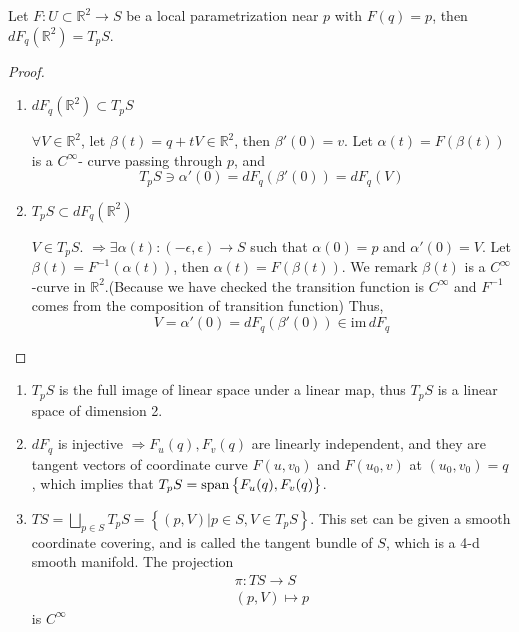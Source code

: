 \begin{proposition}
    Let \(F\colon U\subset \mathbb{R}^2\to S\) be a local parametrization near \(p\) with \(F(q)=p\), then \(dF_q\left(\mathbb{R}^2\right)=T_pS\).
\end{proposition}
\begin{proof}
    \hfill
    \begin{enumerate}[(1)]
        \item \(dF_q\left(\mathbb{R}^2\right)\subset T_p S\)

              \(\forall V\in \mathbb{R}^2\), let \(\beta(t)=q+t V\in \mathbb{R}
              ^2\), then \(\beta'(0)=v\). Let \(\alpha(t)=F\left(\beta(t)\right)
              \) is a \(C^\infty\)- curve passing through \(p\), and
              \[T_p S\ni \alpha'(0)=dF_q\left(\beta'(0)\right)=dF_q(V)\]
        \item \(T_p S\subset dF_q\left(\mathbb{R}^2\right)\)

              \(V\in T_p S\). \(\Rightarrow \exists \alpha(t)\colon (-\epsilon,
              \epsilon)\to S\) such that \(\alpha(0)=p\) and \(\alpha'(0)=V\).
              Let $\beta(t)=F^{-1}\left(\alpha(t)\right)$, then \(\alpha(t)=F
              \left(\beta(t)\right)\). We remark \(\beta(t)\) is a \(C^\infty\)
              -curve in \(\mathbb{R}^2\).(Because we have checked the transition
              function is \(C^\infty\) and \(F^{-1}\) comes from the composition
              of transition function) Thus,
              \[V=\alpha'(0)=dF_q\left(\beta'(0)\right)\in \mathrm{im}\,dF_q\]
    \end{enumerate}
\end{proof}
\begin{remark}
    \hfill
    \begin{enumerate}[(1)]
        \item \(T_p S\) is the full image of linear space under a linear map, thus \(T_pS\) is a linear space of dimension 2.
        \item \(dF_q\) is injective \(\Rightarrow\)\(F_u(q),F_v(q)\) are
              linearly independent, and they are tangent vectors of coordinate
              curve \(F(u,v_0)\) and \(F(u_0,v)\) at \((u_0,v_0)=q\),
              which implies that \(T_pS =\operatorname{span}\left\{F_u(q),F_v(q)\right\}\).
        \item \(TS=\bigsqcup_{p\in S}T_p S=
              \left\{(p,V)|p\in S,V\in T_pS\right\}\).
              This set can be given a smooth coordinate covering, and is called
              the tangent bundle of \(S\), which is a 4-d smooth manifold. The
              projection
              \begin{align*}
                  \pi\colon TS\to S \\
                  (p,V)\mapsto p
              \end{align*}
              is \(C^\infty\)
    \end{enumerate}
\end{remark}
